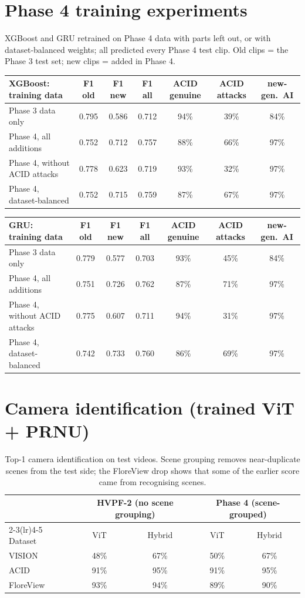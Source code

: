 \documentclass[11pt,a4paper]{article}
\begin{document}
\section{Phase 4 training experiments}
XGBoost and GRU retrained on Phase 4 data with parts left out, or with dataset-balanced weights; all predicted every Phase 4 test clip. Old clips = the Phase 3 test set; new clips = added in Phase 4.
\begin{table}[H]\centering\small\setlength{\tabcolsep}{3.5pt}\begin{tabular}{lcccccc}\toprule XGBoost: training data & F1 old & F1 new & F1 all & ACID genuine & ACID attacks & new-gen.\ AI \\\midrule
Phase 3 data only & 0.795 & 0.586 & 0.712 & 94\% & 39\% & 84\% \\
Phase 4, all additions & 0.752 & 0.712 & 0.757 & 88\% & 66\% & 97\% \\
Phase 4, without ACID attacks & 0.778 & 0.623 & 0.719 & 93\% & 32\% & 97\% \\
Phase 4, dataset-balanced & 0.752 & 0.715 & 0.759 & 87\% & 67\% & 97\% \\
\bottomrule\end{tabular}\end{table}
\begin{table}[H]\centering\small\setlength{\tabcolsep}{3.5pt}\begin{tabular}{lcccccc}\toprule GRU: training data & F1 old & F1 new & F1 all & ACID genuine & ACID attacks & new-gen.\ AI \\\midrule
Phase 3 data only & 0.779 & 0.577 & 0.703 & 93\% & 45\% & 84\% \\
Phase 4, all additions & 0.751 & 0.726 & 0.762 & 87\% & 71\% & 97\% \\
Phase 4, without ACID attacks & 0.775 & 0.607 & 0.711 & 94\% & 31\% & 97\% \\
Phase 4, dataset-balanced & 0.742 & 0.733 & 0.760 & 86\% & 69\% & 97\% \\
\bottomrule\end{tabular}\end{table}
\section{Camera identification (trained ViT + PRNU)}
\begin{table}[H]\centering\small\begin{tabular}{lcccc}\toprule & \multicolumn{2}{c}{HVPF-2 (no scene grouping)} & \multicolumn{2}{c}{Phase 4 (scene-grouped)} \\\cmidrule(lr){2-3}\cmidrule(lr){4-5} Dataset & ViT & Hybrid & ViT & Hybrid \\\midrule
VISION & 48\% & 67\% & 50\% & 67\% \\
ACID & 91\% & 95\% & 91\% & 95\% \\
FloreView & 93\% & 94\% & 89\% & 90\% \\
\bottomrule\end{tabular}\caption{Top-1 camera identification on test videos. Scene grouping removes near-duplicate scenes from the test side; the FloreView drop shows that some of the earlier score came from recognising scenes.}\end{table}
\end{document}

